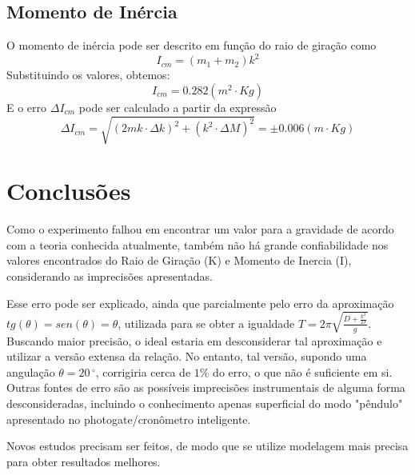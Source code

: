 \documentclass[12pt,a4paper]{article}
\begin{document}
\subsection{Momento de Inércia}
O momento de inércia pode ser descrito em função do raio de giração como 
$$ I_{cm}  = (m_1 + m_2)k^2 $$
Substituindo os valores, obtemos:
$$ I_{cm}  = 0.282 (m^2 \cdot Kg)$$
E o erro $ \Delta I_{cm}$ pode ser calculado a partir da expressão 
$$\Delta I_{cm}  =\sqrt{(2mk \cdot \Delta k)^2 + (k^2 \cdot \Delta M)^2} = \pm 0.006 (m \cdot Kg) $$

\section{Conclusões}
Como o experimento falhou em encontrar um valor para a gravidade de acordo com a teoria conhecida atualmente, também não há grande confiabilidade nos valores encontrados do Raio de Giração (K) e Momento de Inercia (I), considerando as imprecisões apresentadas.

Esse erro pode ser explicado, ainda que parcialmente pelo erro da aproximação $tg(\theta) = sen(\theta) = \theta$, utilizada para se obter a igualdade $ T = 2\pi\sqrt{\frac{D + \frac{k^2}{D}}{g}} $. Buscando maior precisão, o ideal estaria em desconsiderar tal aproximação e utilizar a versão extensa da relação. No entanto, tal versão, supondo uma angulação $\theta = 20\,^{\circ}$, corrigiria cerca de $1\%$ do erro, o que não é suficiente em si. Outras fontes de erro são as possíveis imprecisões instrumentais de alguma forma desconsideradas, incluindo o conhecimento apenas superficial do modo "pêndulo" apresentado no photogate/cronômetro inteligente.

Novos estudos precisam ser feitos, de modo que se utilize modelagem mais precisa para obter resultados melhores.
\end{document}
